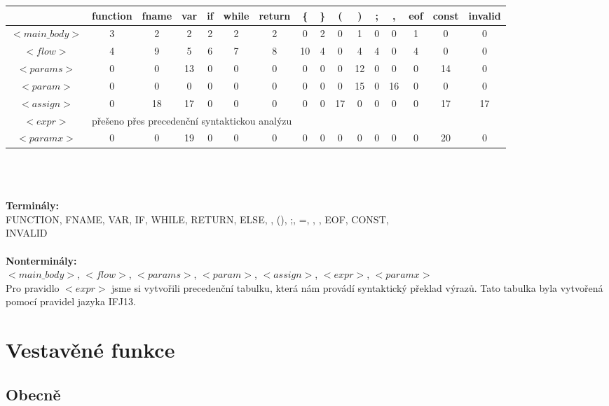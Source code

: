 \documentclass[12pt,a4paper,titlepage,final]{article}
\begin{document}
\scriptsize
\begin{tabular}{|c|c|c|c|c|c|c|c|c|c|c|c|c|c|c|c|}
	\hline
		& function & fname & var & if & while & return & \{ & \} & ( & ) & ; & , & eof & const & invalid \\
	\hline
	$<main\_body>$ & 3 & 2 & 2 & 2 & 2 & 2 & 0 & 2 & 0 & 1 & 0 & 0 & 1 & 0 & 0 \\
	\hline
	$<flow>$ & 4 & 9 & 5 & 6 & 7 & 8 & 10 & 4 & 0 & 4 & 4 & 0 & 4 & 0 & 0 \\
	\hline
	$<params>$ & 0 & 0 & 13 & 0 & 0 & 0 & 0 & 0 & 0 & 12 & 0 & 0 & 0 & 14 & 0 \\
	\hline
	$<param>$ & 0 & 0 & 0 & 0 & 0 & 0 & 0 & 0 & 0 & 15 & 0 & 16 & 0 & 0 & 0 \\
	\hline
	$<assign>$ & 0 & 18 & 17 & 0 & 0 & 0 & 0 & 0 & 17 & 0 & 0 & 0 & 0 & 17 & 17 \\
	\hline
	$<expr>$ & \multicolumn{15}{l|}{přešeno přes precedenční syntaktickou analýzu} \\
	\hline
	$<paramx>$ & 0 & 0 & 19 & 0 & 0 & 0 & 0 & 0 & 0 & 0 & 0 & 0 & 0 & 20 & 0 \\
	\hline
\end{tabular}
\\\\\\
\normalsize
\textbf{Terminály:}\\
FUNCTION, FNAME, VAR, IF, WHILE, RETURN, ELSE, {}, (), ;, =, , , EOF, CONST,\\
INVALID\\\\
\textbf{Nonterminály:}\\
$<main\_body>$, $<flow>$, $<params>$, $<param>$, $<assign>$, $<expr>$, $<paramx>$\\


Pro pravidlo $<expr>$ jsme si vytvořili precedenční tabulku, která nám provádí syntaktický překlad výrazů. 
Tato tabulka byla vytvořená pomocí pravidel jazyka IFJ13.

\newpage
\section{Vestavěné funkce} \label{vestavene}
\subsection{Obecně} 
\end{document}

